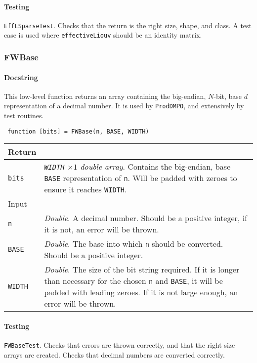  \paragraph{Testing} \lstinline$EffLSparseTest$. Checks that the return is the right size, shape, and class. A test case is used where \lstinline$effectiveLiouv$ should be an identity matrix. 
 
 \subsubsection{FWBase}
 \paragraph{Docstring} This low-level function returns an array containing the big-endian, \(N\)-bit, base \(d\) representation of a decimal number. It is used by \lstinline$ProdDMPO$, and extensively by test routines. 
 \begin{lstlisting}
 function [bits] = FWBase(n, BASE, WIDTH) \end{lstlisting}
 \begin{longtabu}{X[1,l]X[4,l]}
 \hline
 Return & \\ \hline
 \lstinline$bits$ & \emph{\lstinline$WIDTH$ \(\times 1\) double array}. Contains the big-endian, base \lstinline$BASE$ representation of \lstinline$n$. Will be padded with zeroes to ensure it reaches \lstinline$WIDTH$. \\ \hline
 Input & \\ \hline
 \lstinline$n$ & \emph{Double}. A decimal number. Should be a positive integer, if it is not, an error will be thrown. \\
 \lstinline$BASE$ & \emph{Double}. The base into which \lstinline$n$ should be converted. Should be a positive integer. \\
 \lstinline$WIDTH$ & \emph{Double}. The size of the bit string required. If it is longer than necessary for the chosen \lstinline$n$ and \lstinline$BASE$, it will be padded with leading zeroes. If it is not large enough, an error will be thrown. \\
 \hline
 \end{longtabu}
 \paragraph{Testing} \lstinline$FWBaseTest$. Checks that errors are thrown correctly, and that the right size arrays are created. Checks that decimal numbers are converted correctly.

